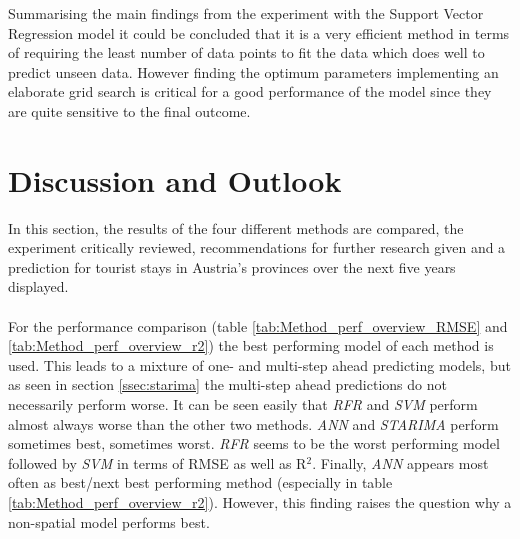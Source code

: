 \documentclass[a4paper,reqno,]{article}
\begin{document}
\noindent
Summarising the main findings from the experiment with the Support Vector Regression model it could be concluded that it is a very efficient method in terms of requiring the least number of data points to fit the data which does well to predict unseen data. However finding the optimum parameters implementing an elaborate grid search is critical for a good performance of the model since they are quite sensitive to the final outcome.     
\newpage
\section{Discussion and Outlook}
\label{sec:disc_and_outl}
In this section, the results of the four different methods are compared, the experiment critically reviewed, recommendations for further research given and a prediction for tourist stays in Austria's provinces over the next five years displayed.
\\
\\
For the performance comparison (table \ref{tab:Method_perf_overview_RMSE} and \ref{tab:Method_perf_overview_r2}) the best performing model of each method is used. This leads to a mixture of one- and multi-step ahead predicting models, but as seen in section \ref{ssec:starima} the multi-step ahead predictions do not necessarily perform worse. It can be seen easily that \textit{RFR} and \textit{SVM} perform almost always worse than the other two methods. \textit{ANN} and \textit{STARIMA} perform sometimes best, sometimes worst. \textit{RFR} seems to be the worst performing model followed by \textit{SVM} in terms of RMSE as well as R$^2$. Finally, \textit{ANN} appears most often as best/next best performing method (especially in table \ref{tab:Method_perf_overview_r2}). However, this finding raises the question why a non-spatial model performs best.
\end{document}
